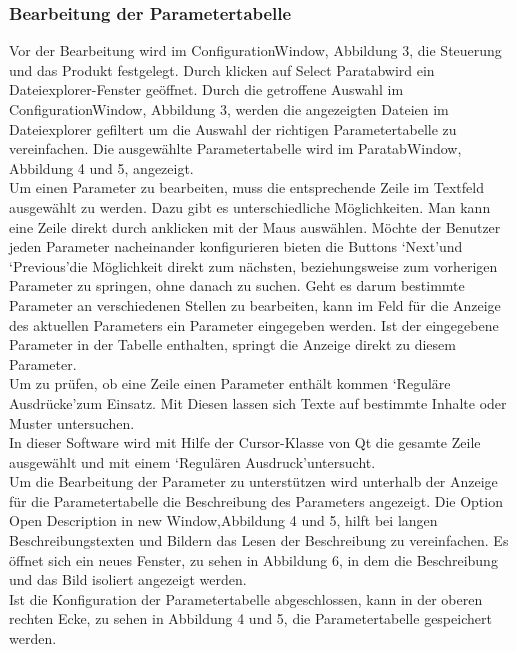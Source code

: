 \documentclass[12pt,a4paper]{article}
\begin{document}
\subsubsection{Bearbeitung der Parametertabelle}
Vor der Bearbeitung wird im ConfigurationWindow, Abbildung 3, die Steuerung und das Produkt festgelegt. Durch klicken auf \glqq Select Paratab\grqq\space wird ein Dateiexplorer-Fenster geöffnet. Durch die getroffene Auswahl im ConfigurationWindow, Abbildung 3, werden die angezeigten Dateien im Dateiexplorer gefiltert um die Auswahl der richtigen Parametertabelle zu vereinfachen. Die ausgewählte Parametertabelle wird im ParatabWindow, Abbildung 4 und 5, angezeigt.\\
Um einen Parameter zu bearbeiten, muss die entsprechende Zeile im Textfeld ausgewählt zu werden. Dazu gibt es unterschiedliche Möglichkeiten. Man kann eine Zeile direkt durch anklicken mit der Maus auswählen. Möchte der Benutzer jeden Parameter nacheinander konfigurieren bieten die Buttons \lq Next\rq\space und \lq Previous\rq\space die Möglichkeit direkt zum nächsten, beziehungsweise zum vorherigen Parameter zu springen, ohne danach zu suchen. Geht es darum bestimmte Parameter an verschiedenen Stellen zu bearbeiten, kann im Feld für die Anzeige des aktuellen Parameters ein Parameter eingegeben werden. Ist der eingegebene Parameter in der Tabelle enthalten, springt die Anzeige direkt zu diesem Parameter.\\
Um zu prüfen, ob eine Zeile einen Parameter enthält kommen \lq Reguläre Ausdrücke\rq\space zum Einsatz. Mit Diesen lassen sich Texte auf bestimmte Inhalte oder Muster untersuchen. \\
In dieser Software wird mit Hilfe der Cursor-Klasse von Qt die gesamte Zeile ausgewählt und mit einem \lq Regulären Ausdruck\rq\space untersucht. \\
Um die Bearbeitung der Parameter zu unterstützen wird unterhalb der Anzeige für die Parametertabelle die Beschreibung des Parameters angezeigt. Die Option \glqq Open Description in new Window\grqq ,\space Abbildung 4 und 5, hilft bei langen Beschreibungstexten und Bildern das Lesen der Beschreibung zu vereinfachen. Es öffnet sich ein neues Fenster, zu sehen in Abbildung 6, in dem die Beschreibung und das Bild isoliert angezeigt werden.\\
Ist die Konfiguration der Parametertabelle abgeschlossen, kann in der oberen rechten Ecke, zu sehen in Abbildung 4 und 5, die Parametertabelle gespeichert werden. 
\end{document}

